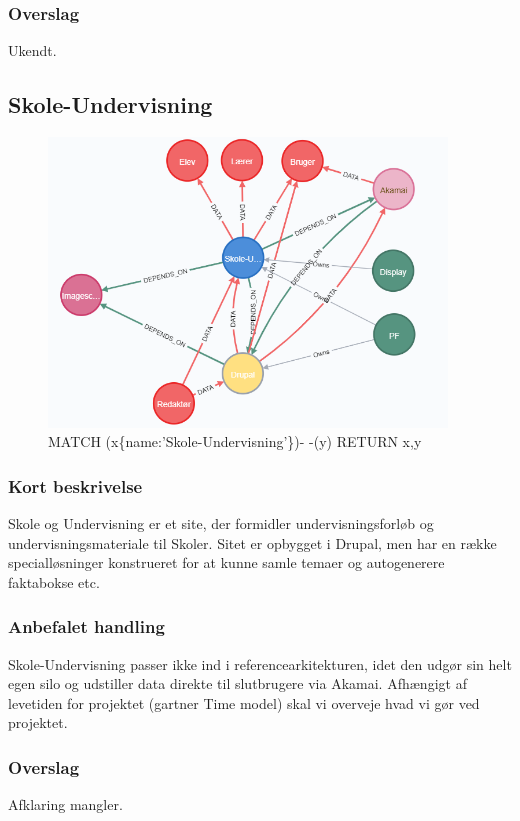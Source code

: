 \documentclass{article}
\begin{document}
\subsubsection{Overslag}
Ukendt.


\subsection{Skole-Undervisning}
\begin{figure}[h]
\includegraphics[width=300pt]{Skole-Undervisning.PNG}
\caption{MATCH (x\{name:'Skole-Undervisning'\})- -(y) RETURN x,y}
\end{figure}
\subsubsection{Kort beskrivelse}
Skole og Undervisning er et site, der formidler undervisningsforløb og undervisningsmateriale til Skoler.  Sitet er opbygget i Drupal, men har en række specialløsninger konstrueret for at kunne samle temaer og autogenerere faktabokse etc. 
\subsubsection{Anbefalet handling}
Skole-Undervisning passer ikke ind i referencearkitekturen, idet den udgør sin helt egen silo og udstiller data direkte til slutbrugere via Akamai. 
Afhængigt af levetiden for projektet (gartner Time model) skal vi overveje hvad vi gør ved projektet.
\subsubsection{Overslag}
Afklaring mangler.
\end{document}
